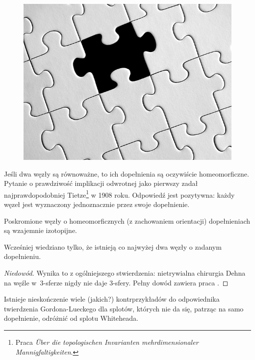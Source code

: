 \begin{example}
\begin{figure}[H]
\begin{minipage}[b]{.32\linewidth}
		\end{minipage}
		\begin{minipage}[b]{.32\linewidth}
			\centering
			\includegraphics[width=\linewidth]{../data/missing.jpg}
		\end{minipage}
	\end{figure}
\end{example}

Jeśli dwa węzły są równoważne, to ich dopełnienia są oczywiście homeomorficzne.
Pytanie o prawdziwość implikacji odwrotnej jako pierwszy zadał najprawdopodobniej Tietze\footnote{Praca \emph{Über die topologischen Invarianten mehrdimensionaler Mannigfaltigkeiten}.} w 1908 roku.
Odpowiedź jest pozytywna: każdy węzeł jest wyznaczony jednoznacznie przez swoje dopełnienie.

\begin{theorem} \label{thm_gordon_luecke}
	Poskromione węzły o homeomorficznych (z zachowaniem orientacji) dopełnieniach są wzajemnie izotopijne.
\end{theorem}

Wcześniej wiedziano tylko, że istnieją co najwyżej dwa węzły o zadanym dopełnieniu.

\begin{proof}[Niedowód]
	Wynika to z ogólniejszego stwierdzenia:
	nietrywialna chirurgia Dehna na węźle w~3-sferze nigdy nie daje 3-sfery.
	Pełny dowód zawiera praca \cite{gordon89}.
\end{proof}

Istnieje nieskończenie wiele (jakich?) kontrprzykładów do odpowiednika twierdzenia Gordona-Lueckego dla splotów,
których nie da się, patrząc na samo dopełnienie, odróżnić od splotu Whiteheada.

